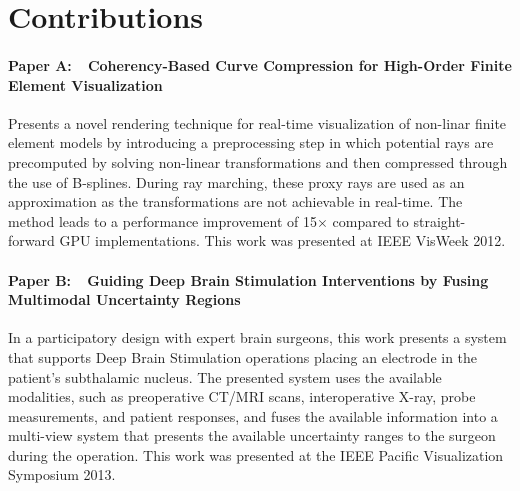 \clearpg

\chapter*{Contributions}

\newcommand{\absubsubsectionlength}{0mm}

\subsubsection{Paper A:~~Coherency-Based Curve Compression for High-Order Finite Element Visualization}
\vspace*{\absubsubsectionlength}
Presents a novel rendering technique for real-time visualization of non-linar finite element models by introducing a preprocessing step in which potential rays are precomputed by solving non-linear transformations and then compressed through the use of B-splines.  During ray marching, these proxy rays are used as an approximation as the transformations are not achievable in real-time.  The method leads to a performance improvement of 15$\times$ compared to straight-forward GPU implementations. This work was presented at IEEE VisWeek 2012.

\subsubsection{Paper B:~~Guiding Deep Brain Stimulation Interventions by Fusing Multimodal Uncertainty Regions}
\vspace*{\absubsubsectionlength}
In a participatory design with expert brain surgeons, this work presents a system that supports Deep Brain Stimulation operations placing an electrode in the patient's subthalamic nucleus.  The presented system uses the available modalities, such as preoperative CT/MRI scans, interoperative X-ray, probe measurements, and patient responses, and fuses the available information into a multi-view system that presents the available uncertainty ranges to the surgeon during the operation.  This work was presented at the IEEE Pacific Visualization Symposium 2013.

